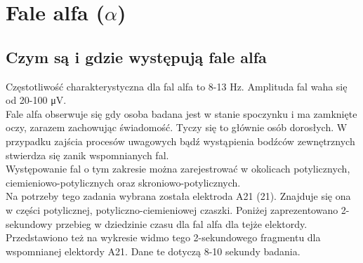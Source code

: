 \documentclass{article}
\begin{document}
    \newpage

\newpage
\section{Fale alfa ($\alpha$)}

    \subsection{Czym są i gdzie występują fale alfa}
    
    Częstotliwość charakterystyczna dla fal alfa to 8-13 Hz. Amplituda fal waha się od 20-100 \si{\micro\volt}.\\

    Fale alfa obserwuje się gdy osoba badana jest w stanie spoczynku i ma zamknięte oczy, zarazem zachowując świadomość. Tyczy się to głównie osób dorosłych. W przypadku zajścia procesów uwagowych bądź wystąpienia bodźców zewnętrznych stwierdza się zanik wspomnianych fal.\\

    Występowanie fal o tym zakresie można zarejestrować w okolicach potylicznych, ciemieniowo-potylicznych oraz skroniowo-potylicznych.\\

    Na potrzeby tego zadania wybrana została elektroda A21 (21). Znajduje się ona w części potylicznej, potyliczno-ciemieniowej czaszki. Poniżej zaprezentowano 2-sekundowy przebieg w dziedzinie czasu dla fal alfa dla tejże elektordy. Przedstawiono też na wykresie widmo tego 2-sekundowego fragmentu dla wspomnianej elektordy A21. Dane te dotyczą 8-10 sekundy badania.
    \newpage
\end{document}
